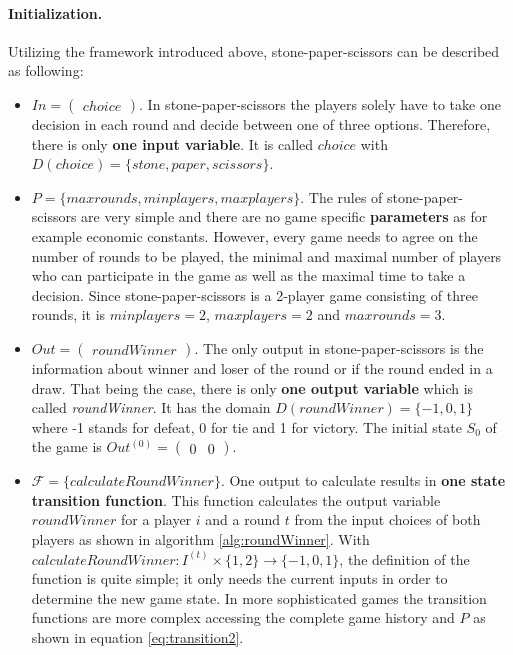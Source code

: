 \paragraph{Initialization.}

Utilizing the framework introduced above, stone-paper-scissors can be described as following:

\begin{itemize}
\item $In=\begin{pmatrix}
       choice
        \end{pmatrix}$. In stone-paper-scissors the players solely have to take one decision in each round and decide between one of three options. Therefore, there is only \textbf{one input variable}. It is called $choice$ with $D(choice) = \{stone, paper, scissors\}$.
\item $P = \{maxrounds, minplayers, maxplayers\}$. The rules of stone-paper- scissors are very simple and there are no game specific \textbf{parameters} as for example economic constants. However, every game needs to agree on the number of rounds to be played, the minimal and maximal number of players who can participate in the game as well as the maximal time to take a decision. Since stone-paper-scissors is a 2-player game consisting of three rounds, it is $minplayers = 2$, $maxplayers = 2$ and $maxrounds = 3$.
\item $Out=\begin{pmatrix}
       roundWinner
        \end{pmatrix}$. The only output in stone-paper-scissors is the information about winner and loser of the round or if the round ended in a draw. That being the case, there is only \textbf{one output variable} which is called \textit{roundWinner}. It has the domain $D(roundWinner) = \{-1,0,1\}$ where -1 stands for defeat, 0 for tie and 1 for victory. The initial state $S_0$ of the game is $Out^{(0)} = \begin{pmatrix}
       0&0
        \end{pmatrix}$.
\item $\mathcal{F}=\{calculateRoundWinner\}$. One output to calculate results in \textbf{one state transition function}. This function calculates the output variable $roundWinner$ for a player $i$ and a round $t$ from the input choices of both players as shown in algorithm \ref{alg:roundWinner}. With $calculateRoundWinner \colon I^{(t)} \times \{1,2\} \to \{-1,0,1\}$, the definition of the function is quite simple; it only needs the current inputs in order to determine the new game state. In more sophisticated games the transition functions are more complex accessing the complete game history and $P$ as shown in equation \ref{eq:transition2}.

\end{itemize}
